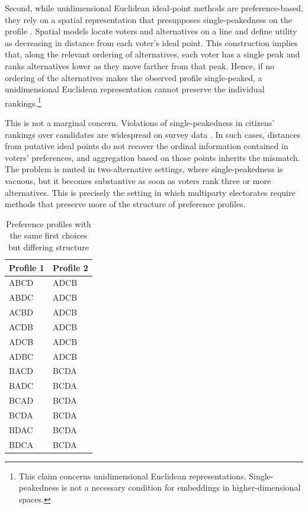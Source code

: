 \documentclass[12pt]{article}
\begin{document}
Second, while unidimensional Euclidean ideal-point methods are preference-based, they rely on a spatial representation that presupposes single-peakedness on the  profile \parencite{elkind2022preference}. Spatial models locate voters and alternatives on a line and define utility as decreasing in distance from each voter's ideal point. This construction implies that, along the relevant ordering of alternatives, each voter has a single peak and ranks alternatives lower as they move farther from that peak. Hence, if no ordering of the alternatives makes the observed profile single-peaked, a unidimensional Euclidean representation cannot preserve the individual rankings.\footnote{This claim concerns unidimensional Euclidean representations. Single-peakedness is not a necessary condition for embeddings in higher-dimensional spaces.}

This is not a marginal concern. Violations of single-peakedness in citizens' rankings over candidates are widespread on survey data \parencite{regenwetter2006behavioral, feld1988ideological, ballester10_charac_singl_peaked_domain}. In such cases, distances from putative ideal points do not recover the ordinal information contained in voters' preferences, and aggregation based on those points inherits the mismatch. The problem is muted in two-alternative settings, where single-peakedness is vacuous, but it becomes substantive as soon as voters rank three or more alternatives. This is precisely the setting in which multiparty electorates require methods that preserve more of the structure of preference profiles.

\begin{table}[htbp]
\centering
\caption{Preference profiles with the same first choices but differing structure}
\label{tab:profile-matrix}
\begin{tabular}{ll}
\toprule
\textbf{Profile 1} & \textbf{Profile 2} \\
\midrule
ABCD & ADCB \\
ABDC & ADCB \\
ACBD & ADCB \\
ACDB & ADCB \\
ADCB & ADCB \\
ADBC & ADCB \\
BACD & BCDA \\
BADC & BCDA \\
BCAD & BCDA \\
BCDA & BCDA \\
BDAC & BCDA \\
BDCA & BCDA \\
\bottomrule
\end{tabular}
\end{table}
\end{document}
